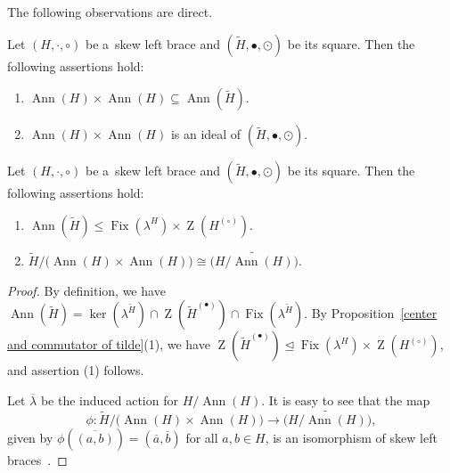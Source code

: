 \documentclass{jonasart}
\theoremstyle{plain}
\DeclareMathOperator{\Ann}{Ann}
\DeclareMathOperator{\Fix}{Fix}
\DeclareMathOperator{\Ker}{ker}
\DeclareMathOperator{\Z}{Z}
\begin{document}
	The following observations are direct.
	
	\begin{lemma}
		Let $(H, \cdot, \circ)$ be a~skew left brace and $(\widetilde{H},\bullet,\odot)$ be its square. Then the following assertions hold:
		\begin{enumerate}
			\item $\Ann(H)\times \Ann(H)\subseteq \Ann(\widetilde{H})$.
			\item $\Ann(H)\times \Ann(H)$ is an ideal of $(\widetilde{H},\bullet,\odot)$.
		\end{enumerate}
		
	\end{lemma}
	
	\begin{lemma}\label{annihilator lemma}
		Let $(H,\cdot,\circ)$ be a~skew left brace and $(\widetilde{H},\bullet,\odot)$ be its square. Then the following assertions hold:
		\begin{enumerate}
			\item $\Ann(\widetilde{H}) \leq \Fix(\lambda^H ) \times \Z(H^{(\circ)})$.
			\item $\widetilde{H}/ \big(\Ann(H) \times \Ann(H) \big) \cong \big(\widetilde{H/ \Ann(H)}\big)$.
		\end{enumerate}
		
	\end{lemma}
	
	\begin{proof}
		By definition, we have $\Ann(\widetilde{H})=\Ker(\lambda^{\widetilde{H}})\cap \Z(\widetilde{H}^{(\bullet)})\cap \Fix(\lambda^{\widetilde{H}})$. By Proposition~\ref{center and commutator of tilde}(1), we have $\Z(\widetilde{H}^{(\bullet)}) \trianglelefteq \Fix(\lambda^H ) \times \Z(H^{(\circ)})$, and assertion (1) follows.
		
		Let $\overline{\lambda}$ be the induced action for $H/\Ann(H)$. It is easy to see that the map
		\[
		\phi: \widetilde{H}/ \big(\Ann(H) \times \Ann(H)\big) \to \big(\widetilde{H/ \Ann(H)}\big),
		\]
		given by $\phi(\overline{(a,b)}) = (\overline{a}, \overline{b})$ for all $a, b \in H$, is an isomorphism of skew left braces~\cite[Remark~3.6]{RSU24}.
	\end{proof}
	
\end{document}
